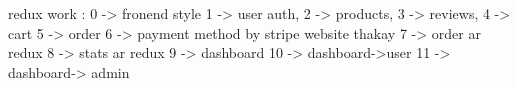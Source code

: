 redux work :
0 -> fronend style
1 -> user auth,
2 -> products,
3 -> reviews,
4 -> cart
5 -> order
6 -> payment method by stripe website thakay
7 -> order ar redux
8 -> stats ar redux
9 -> dashboard 
10 -> dashboard->user 
11 -> dashboard-> admin



